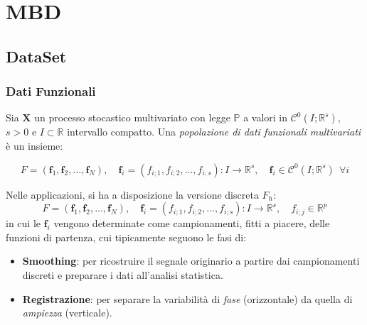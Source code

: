 \documentclass[9pt]{beamer}
\begin{document}

\section{MBD}

\subsection{DataSet}
\begin{frame}
\frametitle{Dati Funzionali}

Sia  $\mathbf{X}$ un processo stocastico multivariato con legge $\mathbb{P}$ a valori in $\mathcal{C}^{0}\left(I;\mathbb{R}^s\right)$,
$s>0$ e $I\subset \mathbb{R}$ intervallo compatto.
Una \emph{popolazione di dati funzionali multivariati} \`e un insieme:

\[
 F = \left( \mathbf{f}_1, \mathbf{f}_2, \ldots, \mathbf{f}_N \right),\quad  \mathbf{f}_i = \left( f_{i;1}, f_{i;2}, \ldots, f_{i;s}\right) : I \longrightarrow \mathbb{R}^s, \quad \mathbf{f}_i \in \mathcal{C}^0\left(I;\mathbb{R}^s\right) \ \ \forall i
\]

Nelle applicazioni, si ha a disposizione la versione discreta $F_h$:
\[
F = \left( \mathbf{f}_1, \mathbf{f}_2, \ldots, \mathbf{f}_N \right),\quad  \mathbf{f}_i = \left( f_{i;1}, f_{i;2}, \ldots, f_{i;s}\right) : I \longrightarrow \mathbb{R}^s, \quad f_{i;j} \in \mathbb{R}^p
\]
in cui le $\mathbf{f}_i$ vengono determinate come campionamenti, fitti a piacere, delle funzioni di partenza, cui tipicamente seguono le fasi di:
\begin{itemize}
 \item \textbf{Smoothing}: per ricostruire il segnale originario a partire dai campionamenti discreti e preparare i dati all’analisi statistica.
 \item \textbf{Registrazione}: per separare la variabilit\`a di \emph{fase} (orizzontale) da quella di \emph{ampiezza} (verticale).
\end{itemize}

\end{frame}

\end{document}
